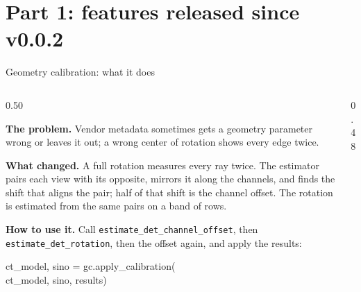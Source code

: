 \documentclass[aspectratio=169,10pt]{beamer}
\newcommand{\tagchip}[2]{{\setlength{\fboxsep}{2.5pt}\setlength{\fboxrule}{0.6pt}%
  \fcolorbox{white}{#1}{\textcolor{white}{\footnotesize\bfseries\strut #2}}}}
\newcommand{\released}{\tagchip{safeGreen}{RELEASED}}
\newcommand{\head}[1]{\textbf{#1}}
\begin{document}
\section{Part 1: features released since v0.0.2}

\begin{frame}{Geometry calibration: what it does \hfill \released}
  \begin{columns}[T]
    \begin{column}{0.50\textwidth}
      {\small
      \head{The problem.}  Vendor metadata sometimes gets a geometry
      parameter wrong or leaves it out; a wrong center of rotation shows
      every edge twice.\par\vspace{3pt}
      \head{What changed.}  A full rotation measures every ray twice.  The
      estimator pairs each view with its opposite, mirrors it along the
      channels, and finds the shift that aligns the pair; half of that shift
      is the channel offset.  The rotation is estimated from the same pairs
      on a band of rows.\par\vspace{3pt}
      \head{How to use it.}  Call \texttt{estimate\_det\_channel\_offset},
      then \texttt{estimate\_det\_rotation}, then the offset again, and apply
      the results:\par\vspace{2pt}
      {\scriptsize\ttfamily
      ct\_model, sino = gc.apply\_calibration(\\
      \hphantom{ct\_model, sino = }ct\_model, sino, results)\par}}
    \end{column}
    \begin{column}{0.48\textwidth}
      \centering
\end{column}
\end{columns}
\end{frame}
\end{document}
